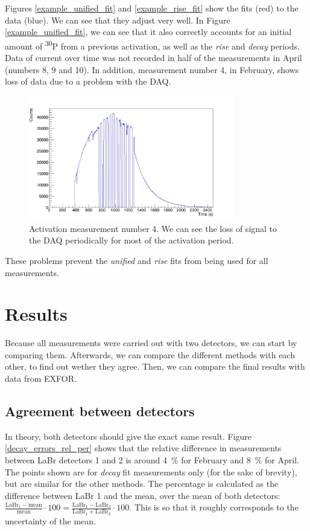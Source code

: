 \documentclass[a4paper,12pt]{report}
\newcommand{\Piso}{\textsuperscript{30}P }
\begin{document}
Figures \ref{example_unified_fit} and \ref{example_rise_fit} show the fits (red) to the data (blue).
We can see that they adjust very well.
In Figure \ref{example_unified_fit}, we can see that it also correctly accounts for an initial amount of \Piso from a previous activation, as well as the \textit{rise} and \textit{decay} periods.
\\

Data of current over time was not recorded in half of the measurements in April (numbers 8, 9 and 10).	%
In addition, measurement number 4, in February, shows loss of data due to a problem with the DAQ.

\begin{figure}[H]
	\centering
	\includegraphics[width=0.80\textwidth]{activation_4_time.png}
	\caption{Activation measurement number 4.
	We can see the loss of signal to the DAQ periodically for most of the activation period.}
	\label{activation_4_time}
\end{figure}

These problems prevent the \textit{unified} and \textit{rise} fits from being used for all measurements.
\\

\section{Results}
Because all measurements were carried out with two detectors, we can start by comparing them.
Afterwards, we can compare the different methods with each other, to find out wether they agree.
Then, we can compare the final results with data from EXFOR.

\subsection{Agreement between detectors}
In theory, both detectors should give the exact same result.
Figure \ref{decay_errors_rel_per} shows that the relative difference in measurements between LaBr detectors 1 and 2 is around \qty{4}{\percent} for February and \qty{8}{\percent} for April.
The points shown are for \textit{decay} fit measurements only (for the sake of brevity), but are similar for the other methods.
The percentage is calculated as the difference between LaBr 1 and the mean, over the mean of both detectors: $\frac{\text{LaBr}_1-\text{mean}}{\text{mean}}\cdot 100 = \frac{\text{LaBr}_1-\text{LaBr}_2}{\text{LaBr}_1+\text{LaBr}_2}\cdot 100$.
This is so that it roughly corresponds to the uncertainty of the mean.
\end{document}
